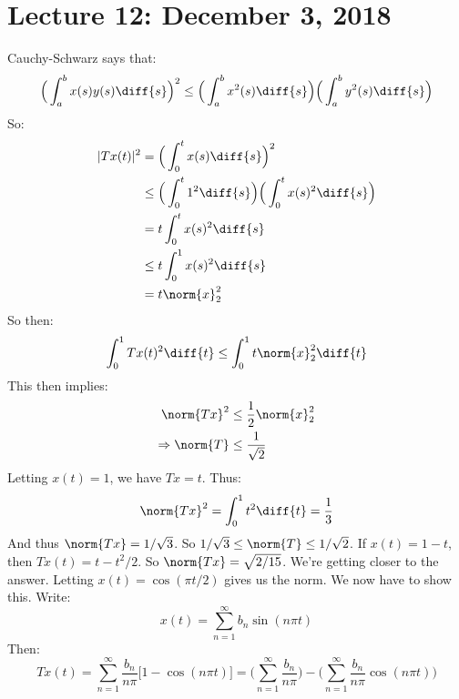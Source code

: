     \section{Lecture 12: December 3, 2018}
        Cauchy-Schwarz says that:
        \begin{equation}
            \Big(\int_{a}^{b}x(s)y(s)\diff{s}\Big)^{2}
            \leq\Big(\int_{a}^{b}x^{2}(s)\diff{s}\Big)
            \Big(\int_{a}^{b}y^{2}(s)\diff{s}\Big)
        \end{equation}
        So:
        \begin{align}
            |Tx(t)|^{2}&=
            \Big(\int_{0}^{t}x(s)\diff{s}\Big)^{2}\\
            &\leq\Big(\int_{0}^{t}1^{2}\diff{s}\Big)
            \Big(\int_{0}^{t}x(s)^{2}\diff{s}\Big)\\
            &=t\int_{0}^{t}x(s)^{2}\diff{s}\\
            &\leq{t}\int_{0}^{1}x(s)^{2}\diff{s}\\
            &=t\norm{x}_{2}^{2}
        \end{align}
        So then:
        \begin{equation}
            \int_{0}^{1}Tx(t)^{2}\diff{t}
            \leq\int_{0}^{1}t\norm{x}_{2}^{2}\diff{t}
        \end{equation}
        This then implies:
        \begin{align}
            \norm{Tx}^{2}&\leq
            \frac{1}{2}\norm{x}_{2}^{2}\\
            \Rightarrow
            \norm{T}&\leq\frac{1}{\sqrt{2}}
        \end{align}
        Letting $x(t)=1$, we have $Tx=t$. Thus:
        \begin{equation}
            \norm{Tx}^{2}=\int_{0}^{1}t^{2}\diff{t}
            =\frac{1}{3}
        \end{equation}
        And thus $\norm{Tx}=1/\sqrt{3}$. So
        $1/\sqrt{3}\leq\norm{T}\leq{1}/\sqrt{2}$.
        If $x(t)=1-t$, then $Tx(t)=t-t^{2}/2$. So
        $\norm{Tx}=\sqrt{2/15}$. We're getting closer to
        the answer. Letting $x(t)=\cos(\pi{t}/2)$ gives
        us the norm. We now have to show this. Write:
        \begin{equation*}
            x(t)=\sum_{n=1}^{\infty}b_{n}\sin(n\pi{t})
        \end{equation*}
        Then:
        \begin{equation*}
            Tx(t)=\sum_{n=1}^{\infty}
            \frac{b_{n}}{n\pi}\big[1-\cos(n\pi{t})\big]
            =\Big(\sum_{n=1}^{\infty}\frac{b_{n}}{n\pi}\Big)
            -\Big(\sum_{n=1}^{\infty}\frac{b_{n}}{n\pi}
            \cos(n\pi{t})\Big)
        \end{equation*}
